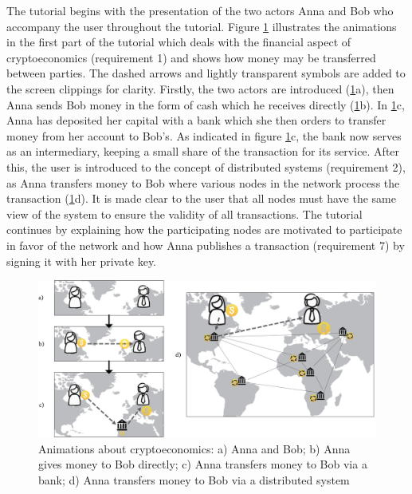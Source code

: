 The tutorial begins with the presentation of the two actors Anna and Bob who accompany the user throughout the tutorial. Figure \ref{fig:Animationline} illustrates the animations in the first part of the tutorial which deals with the financial aspect of cryptoeconomics (requirement 1) and shows how money may be transferred between parties. The dashed arrows and lightly transparent symbols are added to the screen clippings for clarity. Firstly, the two actors are introduced (\ref{fig:Animationline}a), then Anna sends Bob money in the form of cash which he receives directly (\ref{fig:Animationline}b). In \ref{fig:Animationline}c, Anna has deposited her capital with a bank which she then orders to transfer money from her account to Bob's. As indicated in figure \ref{fig:Animationline}c, the bank now serves as an intermediary, keeping a small share of the transaction for its service. After this, the user is introduced to the concept of distributed systems (requirement 2), as Anna transfers money to Bob where various nodes in the network process the transaction (\ref{fig:Animationline}d). It is made clear to the user that all nodes must have the same view of the system to ensure the validity of all transactions. The tutorial continues by explaining how the participating nodes are motivated to participate in favor of the network and how Anna publishes a transaction (requirement 7) by signing it with her private key.

\begin{figure}
    \centering
      \includegraphics[width=\textwidth]{latex-vorlage_v1.5/graphics/Animations2.png} 
    \caption{Animations about cryptoeconomics: a) Anna and Bob; b) Anna gives money to Bob directly; c) Anna transfers money to Bob via a bank; d) Anna transfers money to Bob via a distributed system}
    \label{fig:Animationline}
\end{figure}



